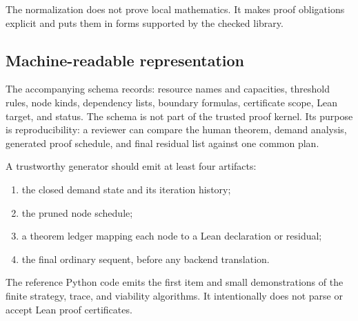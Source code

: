 The normalization does not prove local mathematics.  It makes proof
obligations explicit and puts them in forms supported by the checked library.

\subsection{Machine-readable representation}

The accompanying schema  records:
resource names and capacities, threshold rules, node kinds, dependency lists,
boundary formulas, certificate scope, Lean target, and status.  The schema is
not part of the trusted proof kernel.  Its purpose is reproducibility: a
reviewer can compare the human theorem, demand analysis, generated proof
schedule, and final residual list against one common plan.

A trustworthy generator should emit at least four artifacts:
\begin{enumerate}
  \item the closed demand state and its iteration history;
  \item the pruned node schedule;
  \item a theorem ledger mapping each node to a Lean declaration or residual;
  \item the final ordinary sequent, before any backend translation.
\end{enumerate}
The reference Python code emits the first item and small demonstrations of the
finite strategy, trace, and viability algorithms.  It intentionally does not
parse or accept Lean proof certificates.
